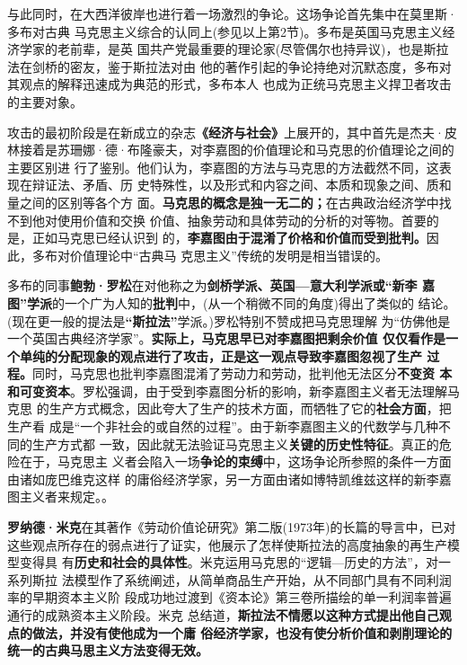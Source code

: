 与此同时，在大西洋彼岸也进行着一场激烈的争论。这场争论首先集中在莫里斯·多布对古典
马克思主义综合的认同上(参见以上第2节)。多布是英国马克思主义经济学家的老前辈，是英
国共产党最重要的理论家(尽管偶尔也持异议)，也是斯拉法在剑桥的密友，鉴于斯拉法对由
他的著作引起的争论持绝对沉默态度，多布对其观点的解释迅速成为典范的形式，多布本人
也成为正统马克思主义捍卫者攻击的主要对象。

攻击的最初阶段是在新成立的杂志\textbf{《经济与社会》}上展开的，其中首先是杰夫·皮
林接着是苏珊娜·德·布隆豪夫，对李嘉图的价值理论和马克思的价值理论之间的主要区别进
行了鉴别。他们认为，李嘉图的方法与马克思的方法截然不同，这表现在辩证法、矛盾、历
史特殊性，以及形式和内容之间、本质和现象之间、质和量之间的区别等各个方
面。\textbf{马克思的概念是独一无二的；}在古典政治经济学中找不到他对使用价值和交换
价值、抽象劳动和具体劳动的分析的对等物。首要的是，正如马克思已经认识到
的，\textbf{李嘉图由于混淆了价格和价值而受到批判。}因此，多布对价值理论中“古典马
克思主义”传统的发明是相当错误的。

多布的同事\textbf{鲍勃·罗松}在对他称之为\textbf{剑桥学派、英国—意大利学派或“新李
  嘉图”学派}的一个广为人知的\textbf{批判}中，(从一个稍微不同的角度)得出了类似的
结论。(现在更一般的提法是\textbf{“斯拉法”}学派。)罗松特别不赞成把马克思理解
为“仿佛他是一个英国古典经济学家”。\textbf{实际上，马克思早已对李嘉图把剩余价值
  仅仅看作是一个单纯的分配现象的观点进行了攻击，正是这一观点导致李嘉图忽视了生产
  过程。}同时，马克思也批判李嘉图混淆了劳动力和劳动，批判他无法区分\textbf{不变资
  本和可变资本}。罗松强调，由于受到李嘉图分析的影响，新李嘉图主义者无法理解马克思
的生产方式概念，因此夸大了生产的技术方面，而牺牲了它的\textbf{社会方面}，把生产看
成是“一个非社会的或自然的过程”。由于新李嘉图主义的代数学与几种不同的生产方式都
一致，因此就无法验证马克思主义\textbf{关键的历史性特征}。真正的危险在于，马克思主
义者会陷入一场\textbf{争论的束缚}中，这场争论所参照的条件一方面由诸如庞巴维克这样
的庸俗经济学家，另一方面由诸如博特凯维兹这样的新李嘉图主义者来规定。。

\textbf{罗纳德·米克}在其著作《劳动价值论研究》第二版(1973年)的长篇的导言中，已对
这些观点所存在的弱点进行了证实，他展示了怎样使斯拉法的高度抽象的再生产模型变得具
有\textbf{历史和社会的具体性}。米克运用马克思的“逻辑—历史的方法”，对一系列斯拉
法模型作了系统阐述，从简单商品生产开始，从不同部门具有不同利润率的早期资本主义阶
段成功地过渡到《资本论》第三卷所描绘的单一利润率普遍通行的成熟资本主义阶段。米克
总结道，\textbf{斯拉法不情愿以这种方式提出他自己观点的做法，并没有使他成为一个庸
  俗经济学家，也没有使分析价值和剥削理论的统一的古典马思主义方法变得无效。}

